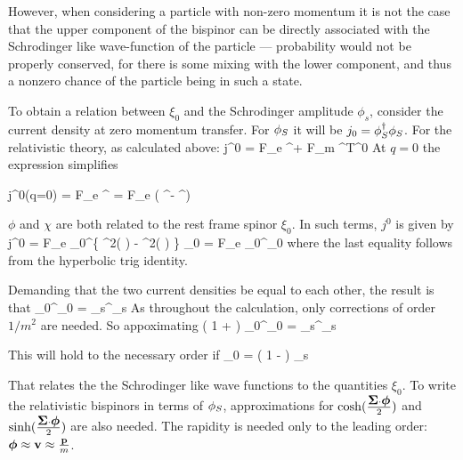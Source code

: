 However, when considering a particle with non-zero momentum it is not the case that the upper component of the bispinor can be directly associated with the Schrodinger like wave-function of the particle --- probability would not be properly conserved, for there is some mixing with the lower component, and thus a nonzero chance of the particle being in such a state.

To obtain a relation between $\xi_0$ and the Schrodinger amplitude $\phi_s$,  consider the current density at zero momentum transfer.  For $\phi_S$ it will be $j_0 =  \phi_S^\dagger \phi_S$.  For the relativistic theory, as calculated above:
\beq
	j^0 = F_e  \Psigbar^\dagger \Psig + F_m 	 \Psigbar^\dagger T^{0\nu} \Psig	
\eeq
At $q=0$ the expression simplifies

\beq
	j^0(q=0) = F_e  \Psigbar^\dagger \Psig
	= F_e  ( \phi^\dagger \phi - \chi^\dagger \chi )
\eeq

$\phi$ and $\chi$ are both related to the rest frame spinor $\xi_0$.  In such terms, $j^0$ is given by
\beq
	j^0 = F_e  \xi_0^\dagger \left \{ 
		\cosh^2( )
		- \sinh^2( )
	\right \} \xi_0  
		=	F_e  \xi_0^\dagger \xi_0
\eeq
where the last equality follows from the hyperbolic trig identity.


Demanding that the two current densities be equal to each other, the result is that
\beq
	 \xi_0^\dagger \xi_0 = \phi_s^\dagger \phi_s
\eeq
As throughout the calculation, only corrections of order $1/m^2$ are needed.  So appoximating
\beq
	\left( 1 +  \right) \xi_0^\dagger \xi_0 = \phi_s^\dagger \phi_s
\eeq

This will hold to the necessary order if
\beq
	\xi_0 = \left( 1 -  \right) \phi_s
\eeq



That relates the the Schrodinger like wave functions to the quantities $\xi_0$.  To write the relativistic bispinors in terms of $\phi_S$, approximations for $\cosh( \frac{\mbox{\boldmath$ \Sigma $} \cdot \mbox{\boldmath$ \phi $} }{2})$ and $\sinh( \frac{\mbox{\boldmath$ \Sigma $} \cdot \mbox{\boldmath$ \phi $} }{2})$ are also needed.  The rapidity is needed only to the leading order: $\mbox{\boldmath$ \phi $} \approx \mathbf{v} \approx \frac{\mathbf{p} }{m}$. 

